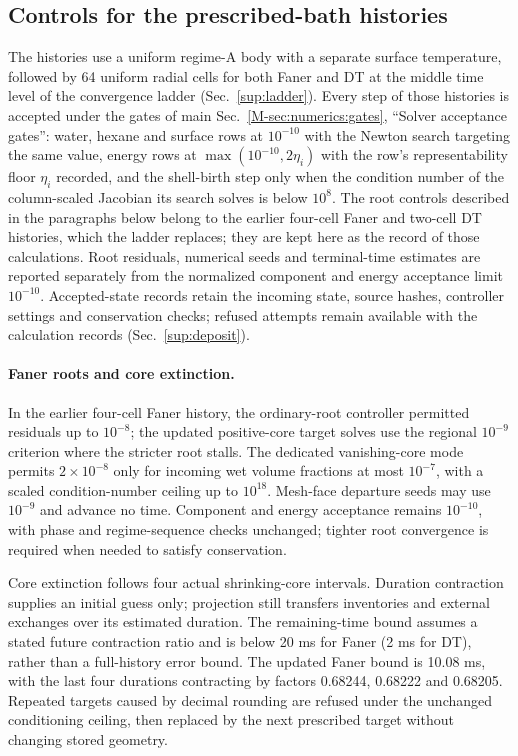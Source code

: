 \subsection{Controls for the prescribed-bath histories}
\label{sup:numericalcontrols}
The histories use a uniform regime-A body with a separate surface
temperature, followed by 64 uniform radial cells for both Faner and DT at
the middle time level of the convergence ladder (Sec.~\ref{sup:ladder}).
Every step of those histories is accepted under the gates of main
Sec.~\ref*{M-sec:numerics:gates}, ``Solver acceptance gates'': water,
hexane and surface rows at $10^{-10}$ with the Newton search targeting the
same value, energy rows at $\max(10^{-10},2\eta_i)$ with the row's
representability floor $\eta_i$ recorded, and the shell-birth step only
when the condition number of the column-scaled Jacobian its search solves
is below $10^{8}$. The root controls described in the paragraphs below
belong to the earlier four-cell Faner and two-cell DT histories, which the
ladder replaces; they are kept here as the record of those calculations.
Root residuals, numerical seeds and terminal-time estimates are reported
separately from the normalized component and energy acceptance limit
$10^{-10}$. Accepted-state records retain the incoming state, source
hashes, controller settings and conservation checks; refused attempts
remain available with the calculation records (Sec.~\ref{sup:deposit}).

\paragraph{Faner roots and core extinction.}
\label{sup:numericalcontrols:faner}
In the earlier four-cell Faner history, the ordinary-root controller permitted residuals up to $10^{-8}$;
the updated positive-core target solves use the regional $10^{-9}$
criterion where the stricter root stalls. The dedicated vanishing-core
mode permits $2\times10^{-8}$ only for incoming wet volume fractions
at most $10^{-7}$, with a scaled condition-number ceiling up to $10^{18}$.
Mesh-face departure seeds may use $10^{-9}$ and advance no time.
Component and energy acceptance remains $10^{-10}$, with phase and
regime-sequence checks unchanged; tighter root convergence is required
when needed to satisfy conservation.

Core extinction follows four actual shrinking-core intervals. Duration
contraction supplies an initial guess only; projection still transfers
inventories and external exchanges over its estimated duration. The
remaining-time bound assumes a stated future contraction ratio and is
below 20 ms for Faner (2 ms for DT), rather than a full-history error
bound. The updated Faner bound is 10.08 ms, with the last four durations
contracting by factors 0.68244, 0.68222 and 0.68205. Repeated targets
caused by decimal rounding are refused under the unchanged conditioning
ceiling, then replaced by the next prescribed target without changing
stored geometry.

